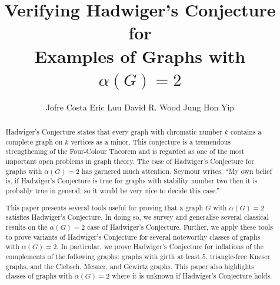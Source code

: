 \documentclass[11pt]{article}
\numberwithin{equation}{section}
\theoremstyle{plain}
\theoremstyle{definition}
\begin{document}


\author
{
    Jofre Costa\footnotemark[1] \qquad
    Eric Luu\footnotemark[2] \qquad
    David R. Wood\footnotemark[2] \qquad
    Jung Hon Yip\footnotemark[2]
}



\title{\bf\boldmath
    Verifying Hadwiger's Conjecture for \\
    Examples of Graphs with $\alpha(G)=2$}
\maketitle

\begin{abstract}
    Hadwiger's Conjecture states that every graph with chromatic number $k$ contains a complete graph on $k$ vertices as a minor. This conjecture is a tremendous strengthening of the Four-Colour Theorem and is regarded as one of the most important open problems in graph theory. The case of Hadwiger's Conjecture for graphs with $\alpha(G) = 2$ has garnered much attention. Seymour writes: ``My own belief is, if Hadwiger's Conjecture is true for graphs with stability number two then it is probably true in general, so it would be very nice to decide this case.''

    This paper presents several tools useful for proving that a graph $G$ with $\alpha(G) = 2$ satisfies Hadwiger's Conjecture. In doing so, we survey and generalise several classical results on the $\alpha(G) = 2$ case of Hadwiger's Conjecture. Further, we apply these tools to prove variants of Hadwiger's Conjecture for several noteworthy classes of graphs with $\alpha(G) = 2$. In particular, we prove Hadwiger's Conjecture for inflations of the complements of the following graphs: graphs with girth at least $5$, triangle-free Kneser graphs, and the Clebsch, Mesner, and Gewirtz graphs.
    This paper also highlights classes of graphs with $\alpha(G) = 2$ where it is unknown if Hadwiger's Conjecture holds.
\end{abstract}
\end{document}
